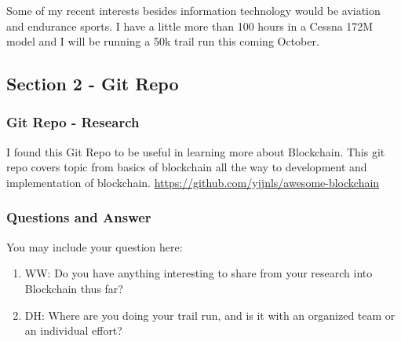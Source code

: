 Some of my recent interests besides information technology would be aviation and endurance sports. I have a little more than 100 hours in a Cessna 172M model and I will be running a 50k trail run this coming October.

\subsection{Section 2 - Git Repo}

\subsubsection{Git Repo - Research}
I found this Git Repo to be useful in learning more about Blockchain. This git repo covers topic from basics of blockchain all the way to development and implementation of blockchain.
\url{https://github.com/yjjnls/awesome-blockchain}


\subsubsection{Questions and Answer} 
You may include your question here:

\begin{enumerate}
    \item WW: Do you have anything interesting to share from your research into Blockchain thus far?
    \item DH: Where are you doing your trail run, and is it with an organized team or an individual effort?
\end{enumerate}
